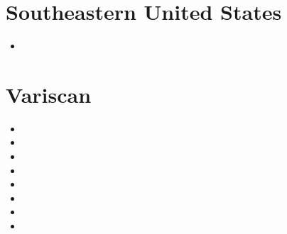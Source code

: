 \section{Southeastern United States}

\begin{small}
\begin{itemize}
\item[\twothousandnineteen] 
\end{itemize}
\end{small}


\section{Variscan}

\begin{small}
\begin{itemize}
\item[\nineteenninetynine] 
\item[\twothousandfour] 
\item[\twothousandseven] 
\item[\twothousandthirteen] 
\item[\twothousandseventeen] 
\item[\twothousandeighteen] 
\item[\twothousandtwenty] 
\item[\twothousandtwentyone] 
\end{itemize}
\end{small}





